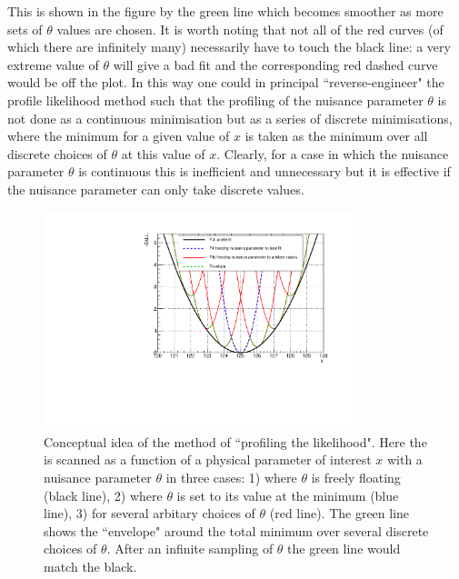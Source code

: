 This is shown in the figure by the green line which becomes smoother as more sets of $\theta$ values are chosen. It is worth noting that not all of the red curves (of which there are infinitely many) necessarily have to touch the black line: a very extreme value of $\theta$ will give a bad fit and the corresponding red dashed curve would be off the plot. In this way one could in principal ``reverse-engineer" the profile likelihood method such that the profiling of the nuisance parameter $\theta$ is not done as a continuous minimisation but as a series of discrete minimisations, where the minimum \NLL for a given value of $x$ is taken as the minimum \NLL over all discrete choices of $\theta$ at this value of $x$. Clearly, for a case in which the nuisance parameter $\theta$ is continuous this is inefficient and unnecessary but it is effective if the nuisance parameter can only take discrete values.

\begin{figure}
\begin{center}
  \includegraphics[width=0.8\textwidth]{analysis/plots/envelope_explain.pdf}
  \caption[Conceptual idea of the method of likelihood profiling]{Conceptual idea of the method of ``profiling the likelihood". Here the \NLL is scanned as a function of a physical parameter of interest $x$ with a nuisance parameter $\theta$ in three cases: 1) where $\theta$ is freely floating (black line), 2) where $\theta$ is set to its value at the \NLL minimum (blue line), 3) for several arbitary choices of $\theta$ (red line). The green line shows the ``envelope" around the total minimum over several discrete choices of $\theta$. After an infinite sampling of $\theta$ the green line would match the black.}
  \label{fig:envelope_explain1}
\end{center}
\end{figure}

